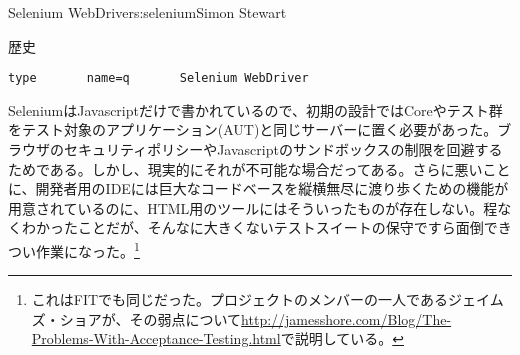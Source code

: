 \begin{aosachapter}{Selenium WebDriver}{s:selenium}{Simon Stewart}
\begin{aosasect1}{歴史}
\begin{verbatim}
type       name=q       Selenium WebDriver
\end{verbatim}

SeleniumはJavascriptだけで書かれているので、初期の設計ではCoreやテスト群をテスト対象のアプリケーション(AUT)と同じサーバーに置く必要があった。ブラウザのセキュリティポリシーやJavascriptのサンドボックスの制限を回避するためである。しかし、現実的にそれが不可能な場合だってある。さらに悪いことに、開発者用のIDEには巨大なコードベースを縦横無尽に渡り歩くための機能が用意されているのに、HTML用のツールにはそういったものが存在しない。程なくわかったことだが、そんなに大きくないテストスイートの保守ですら面倒できつい作業になった。\footnote{これはFITでも同じだった。プロジェクトのメンバーの一人であるジェイムズ・ショアが、その弱点について\url{http://jamesshore.com/Blog/The-Problems-With-Acceptance-Testing.html}で説明している。}



\end{aosasect1}
\end{aosachapter}
